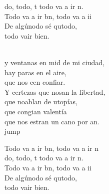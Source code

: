 \begin{cancion}
\begin{chorus}
	do, todo, t todo va a ir n.\\
	Todo va a ir bn, todo va a ii\\
	De algúnodo sé qutodo,\\
	todo vair bien.\\
	\end{chorus}%
	\jump\\
	y ventanas en mid de mi ciudad,\\
	hay paras en el aire,\\
	que nos cen confiar.\\
	Y certezas que nosan la libertad,\\
	que noablan de utopías,\\
	que congian valentía\\
	que nos estran un cano por an.\\jump\\
	\begin{chorus}%
	Todo va a ir bn, todo va a ir n\\
	do, todo, t todo va a ir n.\\
	Todo va a ir bn, todo va a ii\\
	De algúnodo sé qutodo,\\
	todo vair bien.\\
	\end{chorus}%
	\jump\\
\end{cancion}%
